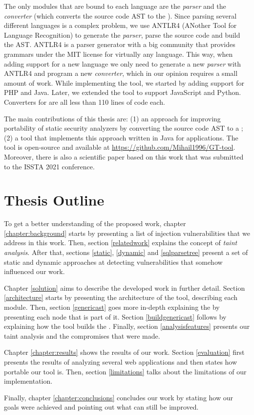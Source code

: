 The only modules that are bound to each language are the \textit{parser} and the \textit{converter} (which converts the source code AST to the \astname{}). Since parsing several different languages is a complex problem, we use ANTLR4 (ANother Tool for Language Recognition) to generate the \textit{parser}, parse the source code and build the AST. ANTLR4 is a parser generator with a big community that provides grammars under the MIT license for virtually any language. This way, when adding support for a new language we only need to generate a new \textit{parser} with ANTLR4 and program a new \textit{converter}, which in our opinion requires a small amount of work. While implementing the \toolname{} tool, we started by adding support for PHP and Java. Later, we extended the tool to support JavaScript and Python. Converters for \implangs{} are all less than 110 lines of code each. 

The main contributions of this thesis are: (1) an approach for improving portability of static security analyzers by converting the source code AST to a \astname{}; (2) a tool that implements this approach written in Java for \implangs{} applications. The tool is open-source and available at \url{https://github.com/Mihail1996/GT-tool}. Moreover, there is also a scientific paper based on this work that was submitted to the ISSTA 2021 conference.


\section{Thesis Outline}

To get a better understanding of the proposed work, chapter \ref{chapter:background} starts by presenting a list of injection vulnerabilities that we address in this work. Then, section \ref{relatedwork} explains the concept of \textit{taint analysis}. After that, sections \ref{static}, \ref{dynamic} and \ref{sqlparsetree} present a set of static and dynamic approaches at detecting vulnerabilities that somehow influenced our work.

Chapter \ref{solution} aims to describe the developed work in further detail. Section \ref{architecture} starts by presenting the architecture of the \toolname{} tool, describing each module. Then, section \ref{genericast} goes more in-depth explaining the \astname{} by presenting each node that is part of it. Section \ref{buildgenericast} follows by explaining how the \toolname{} tool builds the \astname{}. Finally, section \ref{analysisfeatures} presents our taint analysis and the compromises that were made.

Chapter \ref{chapter:results} shows the results of our work. Section \ref{evaluation} first presents the results of analyzing several web applications and then states how portable our tool is. Then, section \ref{limitations} talks about the limitations of our implementation.

Finally, chapter \ref{chapter:conclusions} concludes our work by stating how our goals were achieved and pointing out what can still be improved.